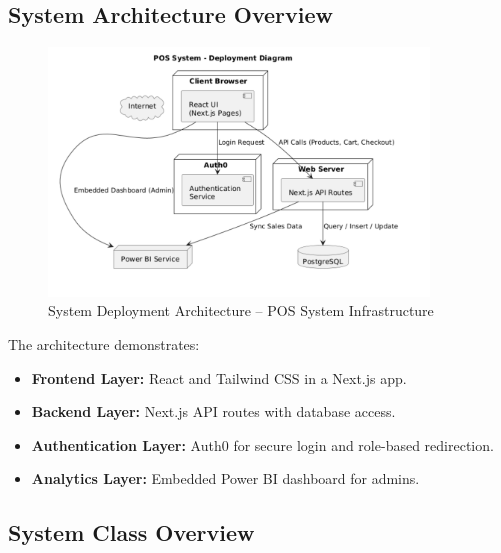 \subsection{System Architecture Overview}

\begin{figure}[H]
  \centering
  \includegraphics[width=0.9\textwidth]{figures/images/sprint0deployment.png}
  \caption{System Deployment Architecture – POS System Infrastructure}
  \label{fig:sprint0-deployment}
\end{figure}

The architecture demonstrates:

\begin{itemize}
  \item \textbf{Frontend Layer:} React and Tailwind CSS in a Next.js app.
  \item \textbf{Backend Layer:} Next.js API routes with database access.
  \item \textbf{Authentication Layer:} Auth0 for secure login and role-based redirection.
  \item \textbf{Analytics Layer:} Embedded Power BI dashboard for admins.
\end{itemize}

\subsection{System Class Overview}


